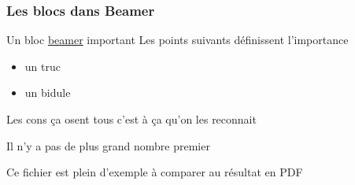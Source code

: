 
\begin{frame}[fragile]
  \frametitle{Les blocs dans Beamer}

  
  \begin{block}{Un bloc \href{https://ctan.org/pkg/beamer}{beamer} important}
    Les points suivants définissent l'importance

    \begin{itemize}
    \item un truc
    \item un bidule
    \end{itemize}
    
  \end{block}



  \begin{definition}
    Les cons ça osent tous c'est à ça qu'on les reconnait
  \end{definition}

  \begin{theorem}
    Il n'y a pas de plus grand nombre premier
  \end{theorem}

  \begin{example}
    Ce fichier est plein d'exemple à comparer au résultat en PDF
  \end{example}
\end{frame}


